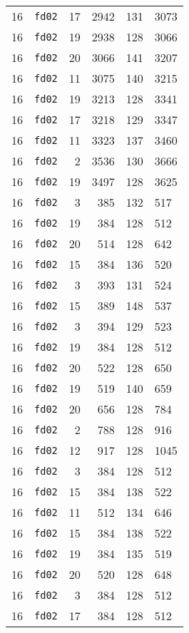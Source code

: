 \documentclass{article}
\begin{document}
\begin{table}[h!]
\begin{tabular}{llrrrl}
    16 & \texttt{fd02} & 17 & 2942 & 131 & 3073 \\
    16 & \texttt{fd02} & 19 & 2938 & 128 & 3066 \\
    16 & \texttt{fd02} & 20 & 3066 & 141 & 3207 \\
    16 & \texttt{fd02} & 11 & 3075 & 140 & 3215 \\
    16 & \texttt{fd02} & 19 & 3213 & 128 & 3341 \\
    16 & \texttt{fd02} & 17 & 3218 & 129 & 3347 \\
    16 & \texttt{fd02} & 11 & 3323 & 137 & 3460 \\
    16 & \texttt{fd02} & 2 & 3536 & 130 & 3666 \\
    16 & \texttt{fd02} & 19 & 3497 & 128 & 3625 \\
    16 & \texttt{fd02} & 3 & 385 & 132 & 517 \\
    16 & \texttt{fd02} & 19 & 384 & 128 & 512 \\
    16 & \texttt{fd02} & 20 & 514 & 128 & 642 \\
    16 & \texttt{fd02} & 15 & 384 & 136 & 520 \\
    16 & \texttt{fd02} & 3 & 393 & 131 & 524 \\
    16 & \texttt{fd02} & 15 & 389 & 148 & 537 \\
    16 & \texttt{fd02} & 3 & 394 & 129 & 523 \\
    16 & \texttt{fd02} & 19 & 384 & 128 & 512 \\
    16 & \texttt{fd02} & 20 & 522 & 128 & 650 \\
    16 & \texttt{fd02} & 19 & 519 & 140 & 659 \\
    16 & \texttt{fd02} & 20 & 656 & 128 & 784 \\
    16 & \texttt{fd02} & 2 & 788 & 128 & 916 \\
    16 & \texttt{fd02} & 12 & 917 & 128 & 1045 \\
    16 & \texttt{fd02} & 3 & 384 & 128 & 512 \\
    16 & \texttt{fd02} & 15 & 384 & 138 & 522 \\
    16 & \texttt{fd02} & 11 & 512 & 134 & 646 \\
    16 & \texttt{fd02} & 15 & 384 & 138 & 522 \\
    16 & \texttt{fd02} & 19 & 384 & 135 & 519 \\
    16 & \texttt{fd02} & 20 & 520 & 128 & 648 \\
    16 & \texttt{fd02} & 3 & 384 & 128 & 512 \\
    16 & \texttt{fd02} & 17 & 384 & 128 & 512 \\

\end{tabular}
\end{table}
\end{document}
